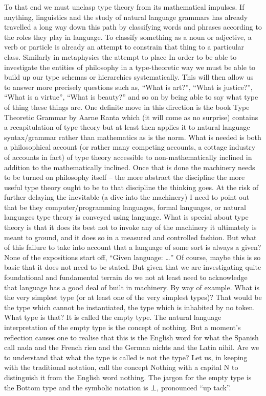 \documentclass[dah,phd,a4paper]{xe_uccthesis}
\begin{document}
To that end we must unclasp type theory from its mathematical impulses. If anything, linguistics and the study of natural language grammars has already travelled a long way down this path by classifying words and phrases according to the roles they play in language. To classify something as a noun or adjective, a verb or particle is already an attempt to constrain that thing to a particular class. Similarly in metaphysics the attempt to place 
In order to be able to investigate the entities of philosophy in a type-theoretic way we must be able to build up our type schemas or hierarchies systematically. This will then allow us to answer more precisely questions such as, “What is art?”, “What is justice?”, “What is a virtue”, “What is beauty?” and so on by being able to say what type of thing these things are. One definite move in this direction is the book Type Theoretic Grammar by Aarne Ranta which (it will come as no surprise) contains a recapitulation of type theory but at least then applies it to natural language syntax/grammar rather than mathematics as is the norm. What is needed is both a philosophical account (or rather many competing accounts, a cottage industry of accounts in fact) of type theory accessible to non-mathematically inclined in addition to the mathematically inclined. Once that is done the machinery needs to be turned on philosophy itself – the more abstract the discipline the more useful type theory ought to be to that discipline the thinking goes.
At the risk of further delaying the inevitable (a dive into the machinery) I need to point out that be they computer/programming languages, formal languages, or natural languages type theory is conveyed using language. What is special about type theory is that it does its best not to invoke any of the machinery it ultimately is meant to ground, and it does so in a measured and controlled fashion. But what of this failure to take into account that a language of some sort is always a given? None of the expositions start off, “Given language: …” Of course, maybe this is so basic that it does not need to be stated. But given that we are investigating quite foundational and fundamental terrain do we not at least need to acknowledge that language has a good deal of built in machinery.
By way of example. What is the very simplest type (or at least one of the very simplest types)? That would be the type which cannot be instantiated, the type which is inhabited by no token. What type is that? It is called the empty type. The natural language interpretation of the empty type is the concept of nothing. But a moment's reflection causes one to realise that this is the English word for what the Spanish call nada and the French rien and the German nichts and the Latin nihil. Are we to understand that what the type is called is not the type? Let us, in keeping with the traditional notation, call the concept Nothing with a capital N to distinguish it from the English word nothing. The jargon for the empty type is the Bottom type and the symbolic notation is ⊥, pronounced “up tack”.
\end{document}
